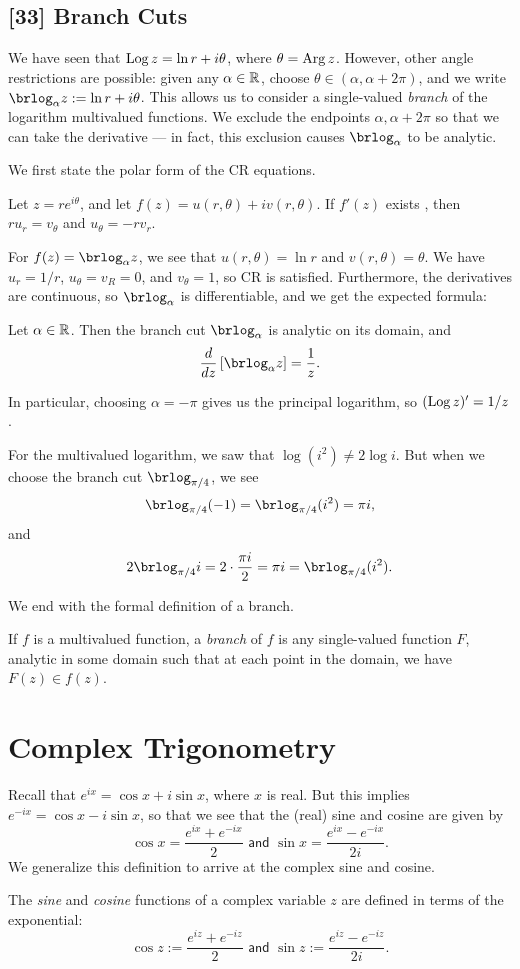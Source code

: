 \documentclass{article}
\begin{document}
\subsection*{[33] Branch Cuts}
We have seen that $\operatorname{Log} z=  \ln r + i\theta$, where $\theta = \operatorname{Arg} z$. However, other angle restrictions are possible: given any $\alpha\in\mathbb R$, choose $\theta\in (\alpha, \alpha+2\pi)$, and we write $\ds\brlog_\alpha z := \ln r  +i\theta$. This allows us to consider a single-valued \textit{branch} of the logarithm multivalued functions. We exclude the endpoints $\alpha, \alpha+2\pi$ so that we can take the derivative --- in fact, this exclusion causes $\ds\brlog_\alpha$ to be analytic.

We first state the polar form of the CR equations.
\begin{proposition}
Let $z = re^{i\theta}$, and let $f(z) = u(r, \theta) + iv(r, \theta)$. If $f'(z)$ exists , then $ru_r = v_\theta$ and $u_\theta = -rv_r$.
\end{proposition}
For $f(z)=\ds\brlog_\alpha z$, we see that $u(r,\theta) = \ln r$ and $v(r, \theta) = \theta$. We have $u_r = 1/r$, $u_\theta = v_R = 0$, and $v_\theta = 1$, so CR is satisfied. Furthermore, the derivatives are continuous, so $\ds\brlog_\alpha$ is differentiable, and we get the expected formula:
\begin{proposition}
Let $\alpha\in\mathbb R$. Then the branch cut $\ds\brlog_\alpha$ is analytic on its domain, and
$$\frac d{dz}\brak{\brlog_\alpha z} = \frac 1z.$$
\end{proposition}
In particular, choosing $\alpha=-\pi$ gives us the principal logarithm, so $(\operatorname{Log} z)' = 1/z$.
\begin{example}
For the multivalued logarithm, we saw that $\log(i^2) \neq 2\log i$. But when we choose the branch cut $\ds\brlog_{\pi/4}$, we see
$$\brlog_{\pi/4} (-1) = \brlog_{\pi/4}(i^2) = \pi i,$$
and
$$2\brlog_{\pi/4} i = 2\cdot \frac{\pi i}2 = \pi i = \brlog_{\pi/4}(i^2).$$
\end{example}
We end with the formal definition of a branch.
\begin{definition}
If $f$ is a multivalued function, a \textit{branch} of $f$ is any single-valued function $F$, analytic in some domain such that at each point in the domain, we have $F(z)\in f(z)$.
\end{definition}
\setcounter{section}{43}
\section{Complex Trigonometry}
Recall that $e^{ix} = \cos x + i\sin x$, where $x$ is real. But this implies $e^{-ix} = \cos x - i\sin x$, so that we see that the (real) sine and cosine are given by
$$\cos x = \frac{e^{ix} + e^{-ix}}2 \textsf{ and } \sin x = \frac{e^{ix} - e^{-ix}}{2i}.$$
We generalize this definition to arrive at the complex sine and cosine.
\newpage
\begin{definition}
The \textit{sine} and \textit{cosine} functions of a complex variable $z$ are defined in terms of the exponential:
$$\cos z := \frac{e^{iz} + e^{-iz}}{2} \textsf{ and } \sin z := \frac{e^{iz} - e^{-iz}}{2i}.$$
\end{definition}
\end{document}
